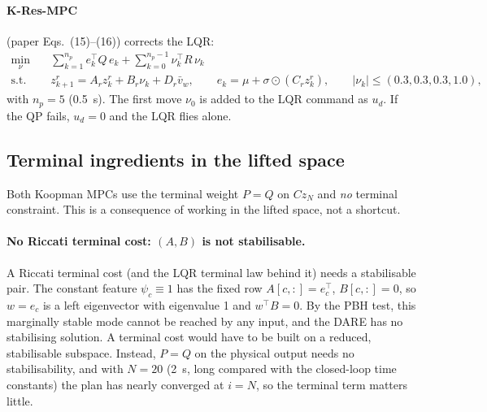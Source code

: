 \documentclass[11pt,a4paper]{article}
\newcommand{\KResMPC}{\textsf{K-Res-MPC}}     %
\begin{document}
	\paragraph{\KResMPC{}} (paper Eqs.~(15)--(16)) corrects the LQR:
	\begin{align}
		\min_{\nu} \quad & \sum_{k=1}^{n_p} e_k^\top Q\, e_k + \sum_{k=0}^{n_p - 1} \nu_k^\top R\, \nu_k \\
		\text{s.t.} \quad & z^r_{k+1} = A_r z^r_k + B_r \nu_k + D_r \bar{v}_w, \qquad
		e_k = \mu + \sigma \odot (C_r z^r_k), \qquad |\nu_k| \le (0.3, 0.3, 0.3, 1.0),
	\end{align}
	with $n_p = 5$ (0.5~s). The first move $\nu_0$ is added to the LQR command as $u_d$. If the QP
	fails, $u_d = 0$ and the LQR flies alone.

	\subsection{Terminal ingredients in the lifted space}
	\label{sec:koopman-terminal}

	Both Koopman MPCs use the terminal weight $P = Q$ on $Cz_N$ and \emph{no} terminal constraint.
	This is a consequence of working in the lifted space, not a shortcut.

	\paragraph{No Riccati terminal cost: $(A, B)$ is not stabilisable.} A Riccati terminal cost (and
	the LQR terminal law behind it) needs a stabilisable pair. The constant feature $\psi_c \equiv 1$
	has the fixed row $A[c,:] = e_c^\top$, $B[c,:] = 0$, so $w = e_c$ is a left eigenvector with
	eigenvalue 1 and $w^\top B = 0$. By the PBH test, this marginally stable mode cannot be reached
	by any input, and the DARE has no stabilising solution. A terminal cost would have to be built on a
	reduced, stabilisable subspace. Instead, $P = Q$ on the physical output needs no stabilisability,
	and with $N = 20$ (2~s, long compared with the closed-loop time constants) the plan has nearly
	converged at $i = N$, so the terminal term matters little.
\end{document}
